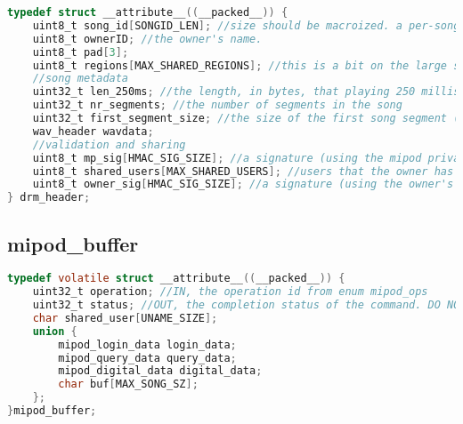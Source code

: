\documentclass[11pt]{extarticle}
\begin{document}
    \begin{lstlisting}[language=C, label={lst:cache}, style=manual_code]
typedef struct __attribute__((__packed__)) {
    uint8_t song_id[SONGID_LEN]; //size should be macroized. a per-song unique ID.
    uint8_t ownerID; //the owner's name.
    uint8_t pad[3];
    uint8_t regions[MAX_SHARED_REGIONS]; //this is a bit on the large size, but disk is cheap so who cares
    //song metadata
    uint32_t len_250ms; //the length, in bytes, that playing 250 milliseconds of audio will take. (the polling interval while playing).
    uint32_t nr_segments; //the number of segments in the song
    uint32_t first_segment_size; //the size of the first song segment (which may not be the full SEGMENT_BUF_SIZE), INcluding trailer.
    wav_header wavdata;
    //validation and sharing
    uint8_t mp_sig[HMAC_SIG_SIZE]; //a signature (using the mipod private key) for all preceeding data
    uint8_t shared_users[MAX_SHARED_USERS]; //users that the owner has shared the song with.
    uint8_t owner_sig[HMAC_SIG_SIZE]; //a signature (using the owner's private key) for all preceeding data. resets whenever new user is shared with.
} drm_header;
    \end{lstlisting}

\subsection{mipod\_buffer}

    \begin{lstlisting}[language=C, label={lst:cache}, style=manual_code]
typedef volatile struct __attribute__((__packed__)) {
    uint32_t operation; //IN, the operation id from enum mipod_ops
    uint32_t status; //OUT, the completion status of the command. DO NOT read this field.
    char shared_user[UNAME_SIZE];
    union {
        mipod_login_data login_data;
        mipod_query_data query_data;
        mipod_digital_data digital_data;
        char buf[MAX_SONG_SZ];
    };
}mipod_buffer;
    \end{lstlisting}
    
\end{document}
